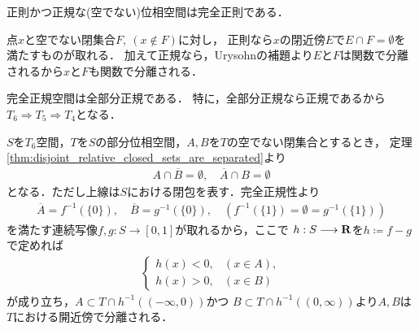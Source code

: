 	\begin{screen}
		\begin{thm}[正則かつ正規なら完全正則]
		\label{thm:if_regular_and_normal_then_completely_normal}
			正則かつ正規な(空でない)位相空間は完全正則である．
		\end{thm}
	\end{screen}
	
	\begin{prf}
		点$x$と空でない閉集合$F,\ (x \notin F)$に対し，
		正則なら$x$の閉近傍$E$で$E \cap F = \emptyset$を満たすものが取れる．
		加えて正規なら，Urysohnの補題より$E$と$F$は関数で分離されるから$x$と$F$も関数で分離される．
		\QED
	\end{prf}
	
	\begin{screen}
		\begin{thm}[$T_4 \Longrightarrow T_3$]
		\end{thm}
	\end{screen}
	
	\begin{screen}
		\begin{thm}
			完全正規空間は全部分正規である．
			特に，全部分正規なら正規であるから
			$T_6 \Longrightarrow T_5 \Longrightarrow T_4$となる．
		\end{thm}
	\end{screen}
	
	\begin{prf}
		$S$を$T_6$空間，$T$を$S$の部分位相空間，$A,B$を$T$の空でない閉集合とするとき，
		定理\ref{thm:disjoint_relative_closed_sets_are_separated}より
		\begin{align}
			A \cap \overline{B} = \emptyset,\quad \overline{A} \cap B = \emptyset
		\end{align}
		となる．ただし上線は$S$における閉包を表す．完全正規性より
		\begin{align}
			\overline{A} = f^{-1}(\{0\}),
			\quad \overline{B} = g^{-1}(\{0\}),
			\quad \left( f^{-1}(\{1\}) = \emptyset = g^{-1}(\{1\}) \right)
		\end{align}
		を満たす連続写像$f,g:S \longrightarrow [0,1]$が取れるから，ここで
		$h:S \longrightarrow \mathbf{R}$を$h \coloneqq f - g$で定めれば
		\begin{align}
			\begin{cases}
				h(x) < 0, & (x \in A), \\
				h(x) > 0, & (x \in B)
			\end{cases}
		\end{align}
		が成り立ち，$A \subset T \cap h^{-1}((-\infty,0))$かつ
		$B \subset T \cap h^{-1}((0,\infty))$より$A,B$は$T$における開近傍で分離される．
		\QED
	\end{prf}
	
